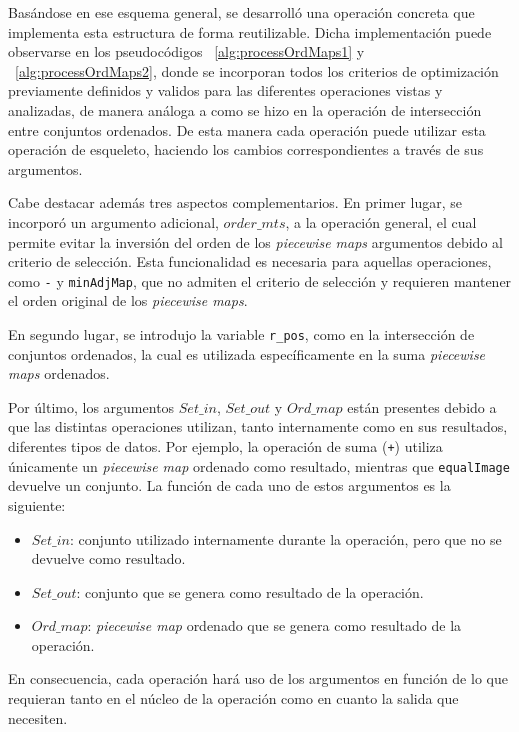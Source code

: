 Basándose en ese esquema general, se desarrolló una operación concreta que implementa esta estructura de forma reutilizable. Dicha implementación puede observarse en los pseudocódigos ~\ref{alg:processOrdMaps1} y ~\ref{alg:processOrdMaps2}, donde se incorporan todos los criterios de optimización previamente definidos y validos para las diferentes operaciones vistas y analizadas, de manera análoga a como se hizo en la operación de intersección entre conjuntos ordenados. De esta manera cada operación puede utilizar esta operación de esqueleto, haciendo los cambios correspondientes a través de sus argumentos.

Cabe destacar además tres aspectos complementarios. En primer lugar, se incorporó un argumento adicional, $order\_mts$, a la operación general, el cual permite evitar la inversión del orden de los \textit{piecewise maps} argumentos debido al criterio de selección. Esta funcionalidad es necesaria para aquellas operaciones, como \texttt{-} y \texttt{minAdjMap}, que no admiten el criterio de selección y requieren mantener el orden original de los \textit{piecewise maps}.

En segundo lugar, se introdujo la variable \texttt{r\_pos}, como en la intersección de  conjuntos ordenados, la cual es utilizada específicamente en la suma \textit{piecewise maps} ordenados.

Por último, los argumentos $Set\_in$, $Set\_out$ y $Ord\_map$ están presentes debido a que las distintas operaciones utilizan, tanto internamente como en sus resultados, diferentes tipos de datos. Por ejemplo, la operación de suma (\texttt{+}) utiliza únicamente un \textit{piecewise map} ordenado como resultado, mientras que \texttt{equalImage} devuelve un conjunto. La función de cada uno de estos argumentos es la siguiente:
\begin{itemize}
    \item $Set\_in$: conjunto utilizado internamente durante la operación, pero que no se devuelve como resultado.
    \item $Set\_out$: conjunto que se genera como resultado de la operación.
    \item $Ord\_map$: \textit{piecewise map} ordenado que se genera como resultado de la operación.
\end{itemize}

En consecuencia, cada operación hará uso de los argumentos en función de lo que requieran tanto en el núcleo de la operación como en cuanto la salida que necesiten.


